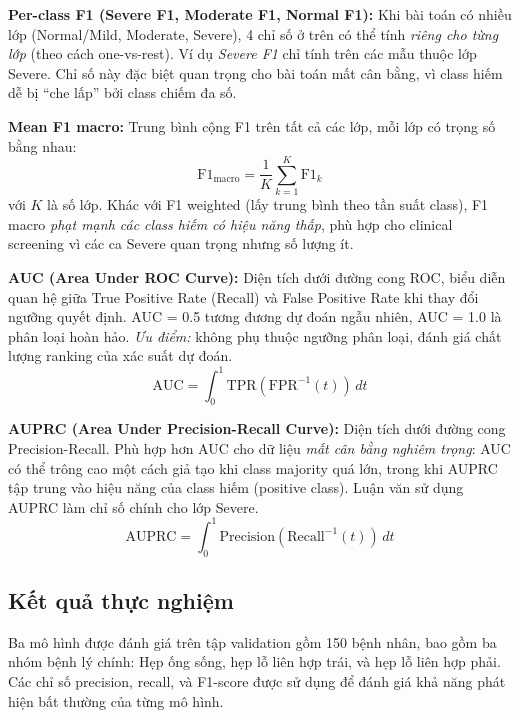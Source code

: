 \textbf{Per-class F1 (Severe F1, Moderate F1, Normal F1):} Khi bài toán có nhiều lớp (Normal/Mild, Moderate, Severe), 4 chỉ số ở trên có thể tính \emph{riêng cho từng lớp} (theo cách one-vs-rest). Ví dụ \textit{Severe F1} chỉ tính trên các mẫu thuộc lớp Severe. Chỉ số này đặc biệt quan trọng cho bài toán mất cân bằng, vì class hiếm dễ bị ``che lấp'' bởi class chiếm đa số.

\textbf{Mean F1 macro:} Trung bình cộng F1 trên tất cả các lớp, mỗi lớp có trọng số bằng nhau:
\begin{equation}
    \text{F1}_{\text{macro}} = \frac{1}{K} \sum_{k=1}^{K} \text{F1}_k
\end{equation}
với $K$ là số lớp. Khác với F1 weighted (lấy trung bình theo tần suất class), F1 macro \emph{phạt mạnh các class hiếm có hiệu năng thấp}, phù hợp cho clinical screening vì các ca Severe quan trọng nhưng số lượng ít.

\textbf{AUC (Area Under ROC Curve):} Diện tích dưới đường cong ROC, biểu diễn quan hệ giữa True Positive Rate (Recall) và False Positive Rate khi thay đổi ngưỡng quyết định. AUC = 0.5 tương đương dự đoán ngẫu nhiên, AUC = 1.0 là phân loại hoàn hảo. \emph{Ưu điểm:} không phụ thuộc ngưỡng phân loại, đánh giá chất lượng ranking của xác suất dự đoán.
\begin{equation}
    \text{AUC} = \int_0^1 \text{TPR}(\text{FPR}^{-1}(t)) \, dt
\end{equation}

\textbf{AUPRC (Area Under Precision-Recall Curve):} Diện tích dưới đường cong Precision-Recall. Phù hợp hơn AUC cho dữ liệu \emph{mất cân bằng nghiêm trọng}: AUC có thể trông cao một cách giả tạo khi class majority quá lớn, trong khi AUPRC tập trung vào hiệu năng của class hiếm (positive class). Luận văn sử dụng AUPRC làm chỉ số chính cho lớp Severe.
\begin{equation}
    \text{AUPRC} = \int_0^1 \text{Precision}(\text{Recall}^{-1}(t)) \, dt
\end{equation}

\subsection{Kết quả thực nghiệm}

Ba mô hình được đánh giá trên tập validation gồm 150 bệnh nhân, bao gồm ba nhóm bệnh lý chính: Hẹp ống sống, hẹp lỗ liên hợp trái, và hẹp lỗ liên hợp phải. Các chỉ số precision, recall, và F1-score được sử dụng để đánh giá khả năng phát hiện bất thường của từng mô hình.

